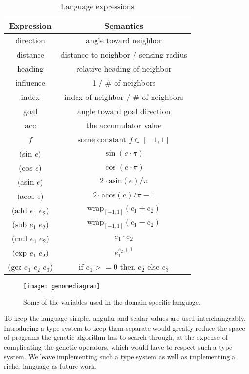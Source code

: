 \begin{table}[h]
\centering
\begin{tabular}{|c|c|} 
    \hline
    \textbf{Expression} & \textbf{Semantics} \\
    \hline
    direction & angle toward neighbor\\ \hline
    distance & distance to neighbor / sensing radius \\ \hline
    heading & relative heading of neighbor \\ \hline
    influence & 1 / \# of neighbors \\ \hline
    index & index of neighbor / \# of neighbors\\ \hline
    goal & angle toward goal direction \\ \hline
    acc & the accumulator value \\ \hline
    $f$ & some constant $f \in [-1, 1]$ \\ \hline
    (sin $e$) & $\sin(e\cdot\pi)$\\ \hline
    (cos $e$) & $\cos(e\cdot\pi)$\\ \hline
    (asin $e$) & $2\cdot\text{asin}(e)/\pi$\\ \hline
    (acos $e$) & $2\cdot\text{acos}(e)/\pi - 1$\\ \hline
    (add $e_1$ $e_2$) & $\text{wrap}_{[-1,1]}(e_1 + e_2)$ \\ \hline
    (sub $e_1$ $e_2$) & $\text{wrap}_{[-1,1]}(e_1 - e_2)$\\ \hline
    (mul $e_1$ $e_2$) & $e_1 \cdot e_2$\\ \hline
    (exp $e_1$ $e_2$) & $e_1^{e_2+1}$\\ \hline
    (gez $e_1$ $e_2$ $e_3$) & if $e_1 >= 0$ then $e_2$ else $e_3$ \\ \hline
\end{tabular}
\caption{Language expressions}
\label{table:lang_exprs}
\end{table}
\begin{figure}
    \centering
    \texttt{[image: genomediagram]}
    \caption{Some of the variables used in the domain-specific language.}
    \label{fig:genome_diagram}
\end{figure}

To keep the language simple, angular and scalar values are used
interchangeably.
Introducing a type system to keep them separate would greatly reduce the space
of programs the genetic algorithm has to search through, at the expense of
complicating the genetic operators, which would have to respect such a type
system.
We leave implementing such a type system as well as implementing a richer
language as future work.

